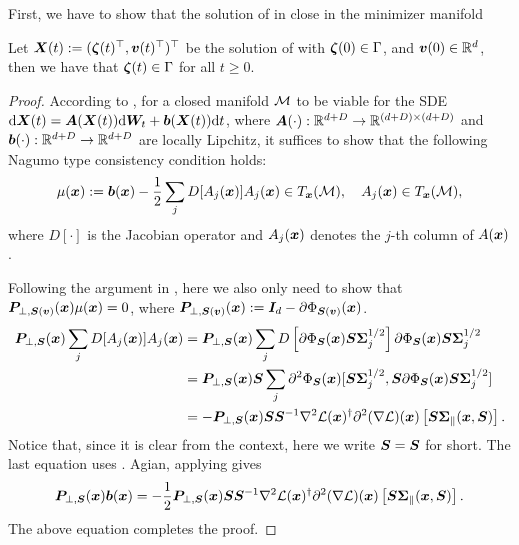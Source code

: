 First, we have to show that the solution of  in close in the minimizer manifold
\begin{lemma}\label{lmm:SDE-in-manifold}
    Let ${\bm{X}}(t) :=({\bm{\zeta}}(t)^{\top},{\bm{v}}(t)^{\top})^{\top}$ be the solution of  with ${\bm{\zeta}}(0)\in\Gamma$, and ${\bm{v}}(0)\in\mathbb{R}^d$, then we have that ${\bm{\zeta}}(t)\in\Gamma$ for all $t\ge0$.
\end{lemma}
\begin{proof}
    According to \citet{filipovic2000invariant,du2006invariant}, for a closed manifold $\mathcal{M}$ to be viable for the SDE $\mathrm{d} {\bm{X}}(t) = {\bm{A}}({\bm{X}}(t))\mathrm{d} {\bm{W}}_t + {\bm{b}}({\bm{X}}(t))\mathrm{d} t$, where ${\bm{A}}(\cdot):\mathbb{R}^{d+D} \to \mathbb{R}^{(d+D) \times (d+D)}$ and ${\bm{b}}(\cdot):\mathbb{R}^{d+D} \to\mathbb{R}^{d+D}$ are locally Lipchitz, it suffices to show that the following Nagumo type consistency condition holds:
    \begin{align*}
        \mu({\bm{x}}):= {\bm{b}}({\bm{x}}) - \frac{1}{2}\sum_{j}D[A_j({\bm{x}})]A_j({\bm{x}}) \in T_{{\bm{x}}}(\mathcal{M}),\quad A_j({\bm{x}})\in T_{{\bm{x}}}(\mathcal{M}),
    \end{align*}
    where $D[\cdot]$ is the Jacobian operator and $A_j({\bm{x}})$ denotes the $j$-th column of $A({\bm{x}})$.
    
    Following the argument in \citet{gu2023andwhendoeslocal}, here we also only need to show that ${\bm{P}}_{\perp,{\bm{S}}({\bm{v}})}({\bm{x}})\mu({\bm{x}})=0$, where ${\bm{P}}_{\perp,{\bm{S}}({\bm{v}})}({\bm{x}}):= {\bm{I}}_d - \partial \Phi_{{\bm{S}}({\bm{v}})}({\bm{x}})$. 
    \begin{align*}
        {\bm{P}}_{\perp,{\bm{S}}}({\bm{x}})\sum_{j}D[A_j({\bm{x}})]A_j({\bm{x}}) &= {\bm{P}}_{\perp,{\bm{S}}}({\bm{x}}) \sum_j D\left[\partial \Phi_{{\bm{S}}}({\bm{x}}) {\bm{S}} {\bm{\Sigma}}^{1/2}_j\right]\partial \Phi_{{\bm{S}}}({\bm{x}}) {\bm{S}} {\bm{\Sigma}}^{1/2}_j\\
        &= {\bm{P}}_{\perp,{\bm{S}}}({\bm{x}})  {\bm{S}}\sum_j \partial^2 \Phi_{{\bm{S}}}({\bm{x}})[{\bm{S}} {\bm{\Sigma}}^{1/2}_j, {\bm{S}}\partial \Phi_{{\bm{S}}}({\bm{x}}) {\bm{S}} {\bm{\Sigma}}^{1/2}_j]\\
        &= - {\bm{P}}_{\perp,{\bm{S}}}({\bm{x}}) {\bm{S}}{\bm{S}}^{-1} \nabla^2 \mathcal{L}({\bm{x}})^{\dagger} \partial^2 (\nabla \mathcal{L})({\bm{x}})\left[{\bm{S}} {\bm{\Sigma}}_{\parallel}({\bm{x}},{\bm{S}})\right].
    \end{align*}
    Notice that, since it is clear from the context, here we write ${\bm{S}} = {\bm{S}}$ for short. The last equation uses . Agian, applying  gives
    \begin{align*}
        {\bm{P}}_{\perp,{\bm{S}}}({\bm{x}}) {\bm{b}}({\bm{x}}) = - \frac{1}{2} {\bm{P}}_{\perp,{\bm{S}}}({\bm{x}}) {\bm{S}} {\bm{S}}^{-1} \nabla^2 \mathcal{L}({\bm{x}})^{\dagger} \partial^2 (\nabla \mathcal{L})({\bm{x}})\left[{\bm{S}} {\bm{\Sigma}}_{\parallel}({\bm{x}},{\bm{S}})\right].
    \end{align*}
    The above equation completes the proof.
\end{proof}
